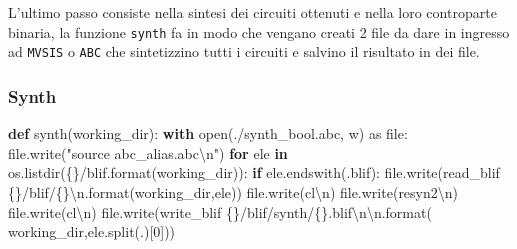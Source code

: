 \documentclass[
  italian,
]{book}
\newenvironment{Shaded}{\begin{snugshade}}{\end{snugshade}}
\newcommand{\BuiltInTok}[1]{#1}
\newcommand{\CharTok}[1]{\textcolor[rgb]{0.31,0.60,0.02}{#1}}
\newcommand{\ControlFlowTok}[1]{\textcolor[rgb]{0.13,0.29,0.53}{\textbf{#1}}}
\newcommand{\DecValTok}[1]{\textcolor[rgb]{0.00,0.00,0.81}{#1}}
\newcommand{\ImportTok}[1]{#1}
\newcommand{\KeywordTok}[1]{\textcolor[rgb]{0.13,0.29,0.53}{\textbf{#1}}}
\newcommand{\NormalTok}[1]{#1}
\newcommand{\SpecialCharTok}[1]{\textcolor[rgb]{0.00,0.00,0.00}{#1}}
\newcommand{\StringTok}[1]{\textcolor[rgb]{0.31,0.60,0.02}{#1}}
\begin{document}
L'ultimo passo consiste nella sintesi dei circuiti ottenuti e nella loro controparte binaria, la funzione \texttt{synth} fa in modo che vengano creati 2 file da dare in ingresso ad \texttt{MVSIS} o \texttt{ABC} che sintetizzino tutti i circuiti e salvino il risultato in dei file.

\hypertarget{synth}{%
\subsubsection{Synth}\label{synth}}

\begin{Shaded}
\begin{Highlighting}[]
\KeywordTok{def}\NormalTok{ synth(working\_dir):  }
  \ControlFlowTok{with} \BuiltInTok{open}\NormalTok{(}\StringTok{\textquotesingle{}./synth\_bool.abc\textquotesingle{}}\NormalTok{, }\StringTok{\textquotesingle{}w\textquotesingle{}}\NormalTok{) }\ImportTok{as} \BuiltInTok{file}\NormalTok{:}
    \BuiltInTok{file}\NormalTok{.write(}\StringTok{"source abc\_alias.abc}\CharTok{\textbackslash{}n}\StringTok{"}\NormalTok{)}
    \ControlFlowTok{for}\NormalTok{ ele }\KeywordTok{in}\NormalTok{ os.listdir(}\StringTok{\textquotesingle{}}\SpecialCharTok{\{\}}\StringTok{/blif\textquotesingle{}}\NormalTok{.}\BuiltInTok{format}\NormalTok{(working\_dir)):}
      \ControlFlowTok{if}\NormalTok{ ele.endswith(}\StringTok{\textquotesingle{}.blif\textquotesingle{}}\NormalTok{):}
        \BuiltInTok{file}\NormalTok{.write(}\StringTok{\textquotesingle{}read\_blif }\SpecialCharTok{\{\}}\StringTok{/blif/}\SpecialCharTok{\{\}}\CharTok{\textbackslash{}n}\StringTok{\textquotesingle{}}\NormalTok{.}\BuiltInTok{format}\NormalTok{(working\_dir,ele))}
        \BuiltInTok{file}\NormalTok{.write(}\StringTok{\textquotesingle{}cl}\CharTok{\textbackslash{}n}\StringTok{\textquotesingle{}}\NormalTok{)}
        \BuiltInTok{file}\NormalTok{.write(}\StringTok{\textquotesingle{}resyn2}\CharTok{\textbackslash{}n}\StringTok{\textquotesingle{}}\NormalTok{)}
        \BuiltInTok{file}\NormalTok{.write(}\StringTok{\textquotesingle{}cl}\CharTok{\textbackslash{}n}\StringTok{\textquotesingle{}}\NormalTok{)}
        \BuiltInTok{file}\NormalTok{.write(}\StringTok{\textquotesingle{}write\_blif }\SpecialCharTok{\{\}}\StringTok{/blif/synth/}\SpecialCharTok{\{\}}\StringTok{.blif}\CharTok{\textbackslash{}n\textbackslash{}n}\StringTok{\textquotesingle{}}\NormalTok{.}\BuiltInTok{format}\NormalTok{(}
\NormalTok{          working\_dir,ele.split(}\StringTok{\textquotesingle{}.\textquotesingle{}}\NormalTok{)[}\DecValTok{0}\NormalTok{]))}

\end{Highlighting}
\end{Shaded}
\end{document}
